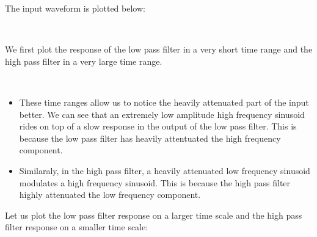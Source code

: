 \documentclass[11pt]{article}
\providecommand{\tightlist}{%
      \setlength{\itemsep}{0pt}\setlength{\parskip}{0pt}}
\begin{document}
	

	

	
		
    The input waveform is plotted below:

	

	

    \begin{center}
    \end{center}
    { \hspace*{\fill} \\}
    
	
		
    We first plot the response of the low pass filter in a very short time
range and the high pass filter in a very large time range.

	

	

    \begin{center}
    \end{center}
    { \hspace*{\fill} \\}
    
	
		
    \begin{itemize}
\tightlist
\item
  These time ranges allow us to notice the heavily attenuated part of
  the input better. We can see that an extremely low amplitude high
  frequency sinusoid rides on top of a slow response in the output of
  the low pass filter. This is because the low pass filter has heavily
  attentuated the high frequency component.
\item
  Similaraly, in the high pass filter, a heavily attenuated low
  frequency sinusoid modulates a high frequency sinusoid. This is
  because the high pass filter highly attenuated the low frequency
  component.
\end{itemize}

	

	
		
    Let us plot the low pass filter response on a larger time scale and the
high pass filter response on a smaller time scale:

	

	

    \begin{center}
    \end{center}
    { \hspace*{\fill} \\}
    
\end{document}
